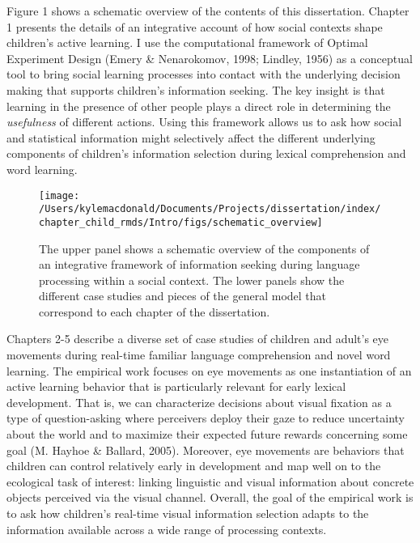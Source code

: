 \documentclass[oneside]{report}
\begin{document}
Figure 1 shows a schematic overview of the contents of this
dissertation. Chapter 1 presents the details of an integrative account
of how social contexts shape children's active learning. I use the
computational framework of Optimal Experiment Design (Emery \&
Nenarokomov, 1998; Lindley, 1956) as a conceptual tool to bring social
learning processes into contact with the underlying decision making that
supports children's information seeking. The key insight is that
learning in the presence of other people plays a direct role in
determining the \emph{usefulness} of different actions. Using this
framework allows us to ask how social and statistical information might
selectively affect the different underlying components of children's
information selection during lexical comprehension and word learning.
\begin{figure}[!t]

{\centering \texttt{[image: /Users/kylemacdonald/Documents/Projects/dissertation/index/chapter\_child\_rmds/Intro/figs/schematic\_overview]} 

}

\caption[Schematic overview of the dissertation content.]{The upper panel shows a schematic overview of the components of an integrative framework of information seeking during language processing within a social context. The lower panels show the different case studies and pieces of the general model that correspond to each chapter of the dissertation.}\label{fig:schematic-overview}
\end{figure}
Chapters 2-5 describe a diverse set of case studies of children and
adult's eye movements during real-time familiar language comprehension
and novel word learning. The empirical work focuses on eye movements as
one instantiation of an active learning behavior that is particularly
relevant for early lexical development. That is, we can characterize
decisions about visual fixation as a type of question-asking where
perceivers deploy their gaze to reduce uncertainty about the world and
to maximize their expected future rewards concerning some goal (M.
Hayhoe \& Ballard, 2005). Moreover, eye movements are behaviors that
children can control relatively early in development and map well on to
the ecological task of interest: linking linguistic and visual
information about concrete objects perceived via the visual channel.
Overall, the goal of the empirical work is to ask how children's
real-time visual information selection adapts to the information
available across a wide range of processing contexts.
\end{document}
